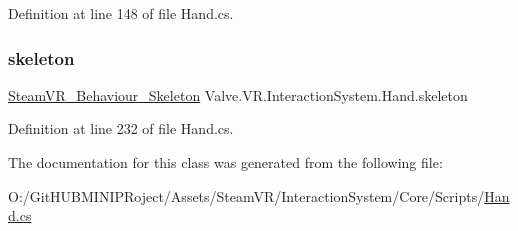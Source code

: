 Definition at line 148 of file Hand.\+cs.

\mbox{\label{class_valve_1_1_v_r_1_1_interaction_system_1_1_hand_ad992f20640f09e339d3d933e013e4a4c}} 
\subsubsection{\texorpdfstring{skeleton}{skeleton}}
{\footnotesize\ttfamily \mbox{\hyperlink{class_valve_1_1_v_r_1_1_steam_v_r___behaviour___skeleton}{Steam\+V\+R\+\_\+\+Behaviour\+\_\+\+Skeleton}} Valve.\+V\+R.\+Interaction\+System.\+Hand.\+skeleton\hspace{0.3cm}{\ttfamily [get]}}



Definition at line 232 of file Hand.\+cs.



The documentation for this class was generated from the following file\+:\begin{DoxyCompactItemize}
\item 
O\+:/\+Git\+H\+U\+B\+M\+I\+N\+I\+P\+Roject/\+Assets/\+Steam\+V\+R/\+Interaction\+System/\+Core/\+Scripts/\mbox{\hyperlink{_steam_v_r_2_interaction_system_2_core_2_scripts_2_hand_8cs}{Hand.\+cs}}\end{DoxyCompactItemize}
